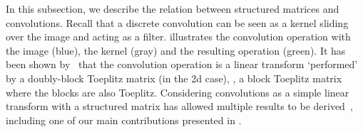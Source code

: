 In this subsection, we describe the relation between structured matrices and convolutions.
Recall that a discrete convolution can be seen as a kernel sliding over the image and acting as a filter.
 illustrates the convolution operation with the image (blue), the kernel (gray) and the resulting operation (green).
It has been shown by~\citet{jain1989fundamentals} that the convolution operation is a linear transform `performed' by a doubly-block Toeplitz matrix (in the 2d case), \ie, a block Toeplitz matrix where the blocks are also Toeplitz.
Considering convolutions as a simple linear transform with a structured matrix has allowed multiple results to be derived~\citet{appuswamy2016structured,wang2020orthogonal,sedghi2018singular,singla2019bounding}, including one of our main contributions presented in .




